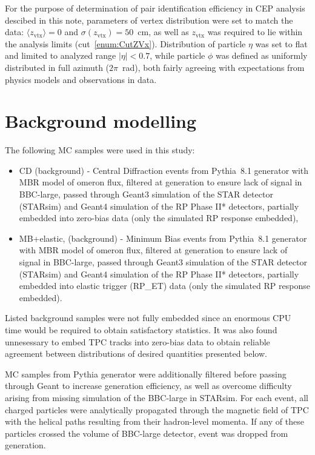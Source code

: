 For the purpose of determination of pair identification efficiency in CEP analysis descibed in this note, parameters of vertex distribution were set to match the data: $\langle z_{\text{vtx}}\rangle=0$ and $\sigma(z_{\text{vtx}})=50$~cm, as well as $z_{\text{vtx}}$ was required to lie within the analysis limits (cut~\ref{enum:CutZVx}). Distribution of particle $\eta$ was set to flat and limited to analyzed range $|\eta|<0.7$, while particle $\phi$ was defined as uniformly distributed in full azimuth ($2\pi$~rad), both fairly agreeing with expectations from physics models and observations in data.

\section{Background modelling}\label{sec:mcBkgdContrib}

The following MC samples were used in this study:
\begin{itemize}
 \item CD (background) - Central Diffraction events from Pythia~8.1 generator with MBR model of \Pom omeron flux, filtered at generation to ensure lack of signal in BBC-large, passed through Geant3 simulation of the STAR detector (STARsim) and Geant4 simulation of the RP Phase II* detectors, partially embedded into zero-bias data (only the simulated RP response embedded),%
 \item MB+elastic, (background) - Minimum Bias events from Pythia~8.1 generator with MBR model of \Pom omeron flux, filtered at generation to ensure lack of signal in BBC-large, passed through Geant3 simulation of the STAR detector (STARsim) and Geant4 simulation of the RP Phase II* detectors, partially embedded into elastic trigger (RP\_ET) data (only the simulated RP response embedded).%
\end{itemize}

Listed background samples were not fully embedded since an enormous CPU time would be required to obtain satisfactory statistics. It was also found unnesessary to embed TPC tracks into zero-bias data to obtain reliable agreement between distributions of desired quantities presented below.

MC samples from Pythia generator were additionally filtered before passing through Geant to increase generation efficiency, as well as overcome difficulty arising from missing simulation of the BBC-large in STARsim. For each event, all charged particles were analytically propagated through the magnetic field of TPC with the helical paths resulting from their hadron-level momenta. If any of these particles crossed the volume of BBC-large detector, event was dropped from generation.


